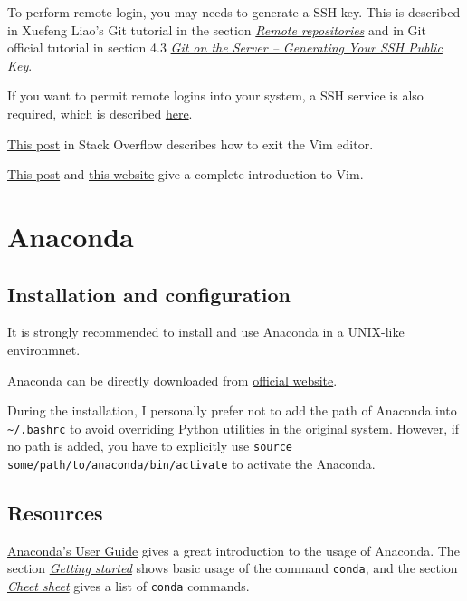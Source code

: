 \documentclass[english]{pkupaper}
\begin{document}
To perform remote login, you may needs to generate a SSH key. This is described in Xuefeng Liao's Git tutorial in the section \href{https://www.liaoxuefeng.com/wiki/0013739516305929606dd18361248578c67b8067c8c017b000/001374385852170d9c7adf13c30429b9660d0eb689dd43a000}{\emph{Remote repositories}} and in Git official tutorial in section 4.3 \href{https://git-scm.com/book/en/v2/Git-on-the-Server-Generating-Your-SSH-Public-Key}{\emph{Git on the Server -- Generating Your SSH Public Key}}.

If you want to permit remote logins into your system, a SSH service is also required, which is described \href{http://www.linuxidc.com/Linux/2010-02/24349.htm}{here}.

\href{https://stackoverflow.com/questions/11828270/how-to-exit-the-vim-editor}{This post} in Stack Overflow describes how to exit the Vim editor.

\href{http://www.jianshu.com/p/bcbe916f97e1}{This post} and \href{https://blog.interlinked.org/tutorials/vim_tutorial.html}{this website} give a complete introduction to Vim.

\section{Anaconda}

\subsection{Installation and configuration}

It is strongly recommended to install and use Anaconda in a UNIX-like environmnet.

Anaconda can be directly downloaded from \href{https://www.anaconda.com/download/}{official website}.

During the installation, I personally prefer not to add the path of Anaconda into \verb"~/.bashrc" to avoid overriding Python utilities in the original system. However, if no path is added, you have to explicitly use \verb"source some/path/to/anaconda/bin/activate" to activate the Anaconda.

\subsection{Resources}

\href{https://conda.io/docs/user-guide/index.html}{Anaconda's User Guide} gives a great introduction to the usage of Anaconda. The section \href{https://conda.io/docs/user-guide/getting-started.html}{\emph{Getting started}} shows basic usage of the command \verb"conda", and the section \href{https://conda.io/docs/user-guide/cheatsheet.html}{\emph{Cheet sheet}} gives a list of \verb"conda" commands.
\end{document}
